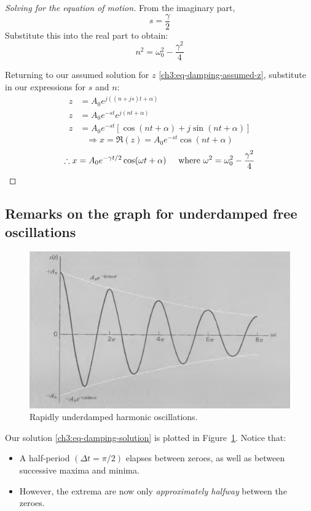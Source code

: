 \begin{proof}[Solving for the equation of motion]
From the imaginary part,
\[ s=\frac{\gamma}{2}\]
Substitute this into the real part to obtain:
\[ n^2 = \omega_0^2 - \frac{\gamma^2}{4} \]

Returning to our assumed solution for $z$ \eqref{ch3:eq-damping-assumed-z}, substitute in our expressions for $s$ and $n$:
\begin{align*}
	z&=A_0 e^{j((n+js)t+\alpha)}  \\
	z &= A_0 e^{-st} e^{j(nt+\alpha)} \\
	z &= A_0 e^{-st} [ \cos(nt+\alpha) + j\sin(nt+\alpha)  ]
\end{align*}
\[ 	\Longrightarrow x = \Re(z) = A_0 e^{-st}\cos(nt+\alpha) \]
\[ \therefore 
x = A_0 e^{-\gamma t/2} \cos(\omega t+\alpha) \hspace{0.5cm}\text{where } \omega^2 = \omega_0^2 - \frac{\gamma^2}{4} \]
\end{proof}


\subsection{Remarks on the graph for underdamped free oscillations}
\begin{figure}[h]
	\centering
	\includegraphics[scale=0.7]{phys232/Ch3-underdamping.png} \caption{Rapidly underdamped harmonic oscillations.}\label{ch3:fig-underdamping}
\end{figure}

Our solution \eqref{ch3:eq-damping-solution} is plotted in Figure~\ref{ch3:fig-underdamping}. Notice that:
\begin{itemize}
	\item A half-period $(\Delta t = \pi/2)$ elapses between zeroes, as well as between successive maxima and minima.
	\item However, the extrema are now only \emph{approximately halfway} between the zeroes.
\end{itemize}


